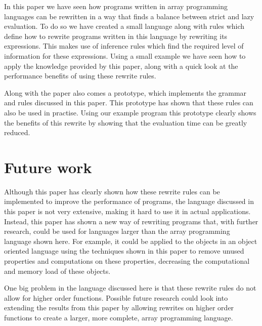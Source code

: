 \documentclass[../main.tex]{subfiles}
\begin{document}
In this paper we have seen how programs written in array programming languages can be rewritten in a way that finds a balance between strict and lazy evaluation.
To do so we have created a small language along with rules which define how to rewrite programs written in this language by rewriting its expressions. This makes use of inference rules which find the required level of information for these expressions. Using a small example we have seen how to apply the knowledge provided by this paper, along with a quick look at the performance benefits of using these rewrite rules.

Along with the paper also comes a prototype, which implements the grammar and rules discussed in this paper. This prototype has shown that these rules can also be used in practise. Using our example program this prototype clearly shows the benefits of this rewrite by showing that the evaluation time can be greatly reduced.

\section{Future work}
Although this paper has clearly shown how these rewrite rules can be implemented to improve the performance of programs, the language discussed in this paper is not very extensive, making it hard to use it in actual applications.
Instead, this paper has shown a new way of rewriting programs that, with further research, could be used for languages larger than the array programming language shown here. For example, it could be applied to the objects in an object oriented language using the techniques shown in this paper to remove unused properties and computations on these properties, decreasing the computational and memory load of these objects.

One big problem in the language discussed here is that these rewrite rules do not allow for higher order functions. Possible future research could look into extending the results from this paper by allowing rewrites on higher order functions to create a larger, more complete, array programming language.
\end{document}
